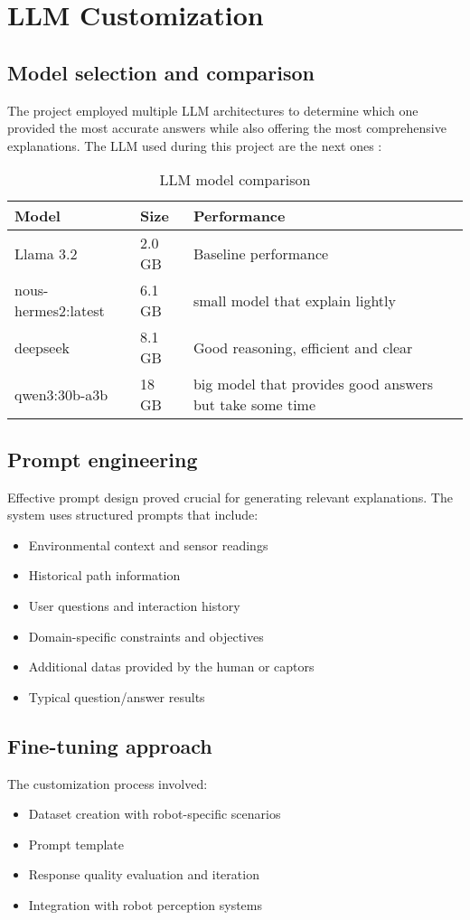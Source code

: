 \section{LLM Customization}

\subsection{Model selection and comparison}

The project employed multiple LLM architectures to determine which one provided the most accurate answers while also offering the most comprehensive explanations.
The LLM used during this project are the next ones :
\begin{table}[ht]
    \centering
    \begin{tabular}{|l|l|l|}
        \hline
        \textbf{Model}      & \textbf{Size} & \textbf{Performance} \\
        \hline
        Llama 3.2           & 2.0 GB        & Baseline performance \\
        nous-hermes2:latest & 6.1 GB        & small model that explain lightly \\
        deepseek            & 8.1 GB        & Good reasoning, efficient and clear\\
        qwen3:30b-a3b       & 18 GB         & big model that provides good answers but take some time \\
        \hline
    \end{tabular}
    \caption{LLM model comparison}
\end{table}

\subsection{Prompt engineering}

Effective prompt design proved crucial for generating relevant explanations. The system uses structured prompts that include:
\begin{itemize}
    \item Environmental context and sensor readings
    \item Historical path information
    \item User questions and interaction history
    \item Domain-specific constraints and objectives
    \item Additional datas provided by the human or captors
    \item Typical question/answer results
\end{itemize}

\subsection{Fine-tuning approach}

The customization process involved:
\begin{itemize}
    \item Dataset creation with robot-specific scenarios
    \item Prompt template
    \item Response quality evaluation and iteration
    \item Integration with robot perception systems
\end{itemize}
